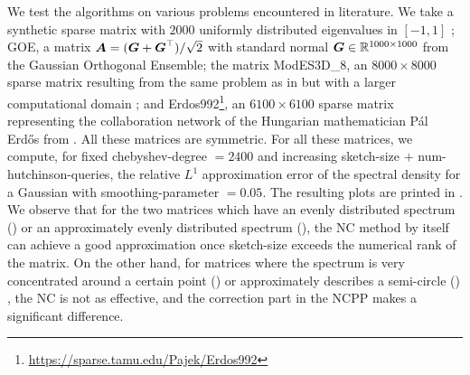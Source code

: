 We test the algorithms on various problems encountered in literature.
We take a synthetic sparse matrix with $2000$ uniformly distributed eigenvalues
in $[-1, 1]$ \cite{chen2021slq};
GOE, a matrix $\boldsymbol{A} = (\boldsymbol{G} + \boldsymbol{G}^{\top})/\sqrt{2}$ with standard
normal $\boldsymbol{G} \in \mathbb{R}^{1000 \times 1000}$ from the Gaussian Orthogonal Ensemble;
the matrix ModES3D\_8, an $8000 \times 8000$ sparse matrix resulting
from the same problem as in  but with
a larger computational domain \cite{lin2017randomized}; and
Erdos992\footnote{\url{https://sparse.tamu.edu/Pajek/Erdos992}},
an $6100 \times 6100$ sparse matrix representing the collaboration network of the
Hungarian mathematician P\'al Erd\H{o}s from \cite{chen2021slq}.
All these
matrices are symmetric. For all these matrices, we compute, for
fixed \gls{chebyshev-degree} $=2400$ and increasing \gls{sketch-size} $+$ \gls{num-hutchinson-queries},
the relative $L^1$ approximation error
of the spectral density for a Gaussian  with
\gls{smoothing-parameter} $=0.05$. The resulting plots are printed in 
.\\ 

We observe that for the two matrices which have an evenly distributed spectrum
() or an approximately
evenly distributed spectrum (),
the \gls{NC} method by itself can achieve a good approximation once \gls{sketch-size}
exceeds the numerical rank of the matrix. On the other hand, for matrices where
the spectrum is very concentrated around a certain point ()
or approximately describes a semi-circle () \cite{wigner1958distribution},
the \gls{NC} is not as effective, and the correction part in the \gls{NCPP} makes
a significant difference.

